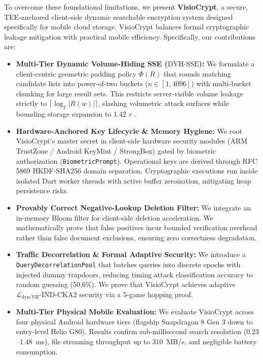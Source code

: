 \documentclass[10pt,conference]{IEEEtran}
\begin{document}
To overcome these foundational limitations, we present \textbf{VisioCrypt}, a secure, TEE-anchored client-side dynamic searchable encryption system designed specifically for mobile cloud storage. VisioCrypt balances formal cryptographic leakage mitigation with practical mobile efficiency. Specifically, our contributions are:
\begin{itemize}
    \item \textbf{Multi-Tier Dynamic Volume-Hiding SSE ($\text{DVH-SSE}$):} We formulate a client-centric geometric padding policy $\Phi(R)$ that rounds matching candidate lists into power-of-two buckets ($n \in [1, 4096]$) with multi-bucket chunking for large result sets. This restricts server-visible volume leakage strictly to $\lceil \log_2 |R(w)| \rceil$, slashing volumetric attack surfaces while bounding storage expansion to $1.42\times$.
    \item \textbf{Hardware-Anchored Key Lifecycle \& Memory Hygiene:} We root VisioCrypt's master secret in client-side hardware security modules (ARM TrustZone / Android KeyMint / StrongBox) gated by biometric authorization (\texttt{BiometricPrompt}). Operational keys are derived through RFC 5869 HKDF-SHA256 domain separation. Cryptographic executions run inside isolated Dart worker threads with active buffer zeroization, mitigating heap persistence risks.
    \item \textbf{Provably Correct Negative-Lookup Deletion Filter:} We integrate an in-memory Bloom filter for client-side deletion acceleration. We mathematically prove that false positives incur bounded verification overhead rather than false document exclusions, ensuring zero correctness degradation.
    \item \textbf{Traffic Decorrelation \& Formal Adaptive Security:} We introduce a \texttt{QueryDecorrelationPool} that batches queries into discrete epochs with injected dummy trapdoors, reducing timing attack classification accuracy to random guessing ($50.6\%$). We prove that VisioCrypt achieves adaptive $\mathcal{L}_{\text{dyn-VH}}\text{-IND-CKA2}$ security via a 5-game hopping proof.
    \item \textbf{Multi-Tier Physical Mobile Evaluation:} We evaluate VisioCrypt across four physical Android hardware tiers (flagship Snapdragon 8 Gen 3 down to entry-level Helio G80). Results confirm sub-millisecond search resolution ($0.23$--$1.48$~ms), file streaming throughput up to $310$~MB/s, and negligible battery consumption.
\end{itemize}
\end{document}
